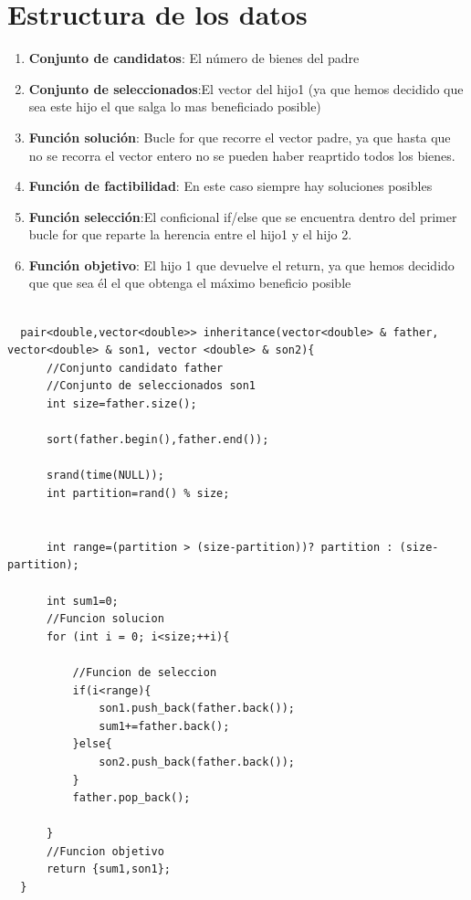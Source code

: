 \documentclass[11pt,openany]{book}
\begin{document}
\section{Estructura de los datos}
\begin{enumerate}
      \item \textbf{Conjunto de candidatos}: El número de bienes del padre
      \item \textbf{Conjunto de seleccionados}:El vector del hijo1 (ya que hemos decidido
      que sea este hijo el que salga lo mas beneficiado posible)
      \item \textbf{Función solución}: Bucle for que recorre el vector padre, ya que hasta que no 
      se recorra el vector entero no se pueden haber reaprtido todos los bienes. 
      \item \textbf{Función de factibilidad}: En este caso siempre hay soluciones posibles
      \item \textbf{Función selección}:El conficional if/else que se encuentra dentro del primer bucle for que reparte
      la herencia entre el hijo1 y el hijo 2.
      \item \textbf{Función objetivo}: El hijo 1 que devuelve el return, ya que hemos decidido que
      que sea él el que obtenga el máximo beneficio posible
\end{enumerate}
\begin{lstlisting}

  pair<double,vector<double>> inheritance(vector<double> & father, vector<double> & son1, vector <double> & son2){
      //Conjunto candidato father
      //Conjunto de seleccionados son1
      int size=father.size();
  
      sort(father.begin(),father.end());
  
      srand(time(NULL));
      int partition=rand() % size;
  
      
      int range=(partition > (size-partition))? partition : (size-partition);
  
      int sum1=0;
      //Funcion solucion
      for (int i = 0; i<size;++i){
          
          //Funcion de seleccion
          if(i<range){
              son1.push_back(father.back());
              sum1+=father.back();
          }else{
              son2.push_back(father.back());
          }
          father.pop_back();
          
      }
      //Funcion objetivo
      return {sum1,son1};
  }
\end{lstlisting}
\end{document}
